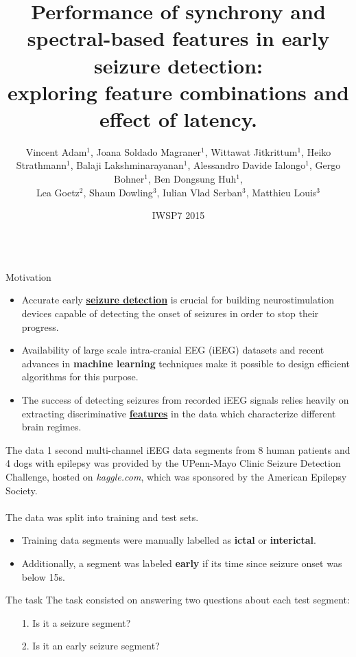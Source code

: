 \documentclass[final,t,overlay, xcolor=table, sans, mathserif]{beamer}
\title{Performance of synchrony and spectral-based features in early seizure detection:\\
exploring feature combinations and effect of latency.}
\author[Adam \& Soldado-Magraner]
{Vincent Adam$^1$, Joana Soldado Magraner$^1$, Wittawat Jitkrittum$^1$, Heiko Strathmann$^1$,
Balaji Lakshminarayanan$^1$, Alessandro Davide Ialongo$^1$, Gergo Bohner$^1$, Ben Dongsung Huh$^1$,\\
 Lea Goetz$^2$, Shaun Dowling$^3$, Iulian Vlad Serban$^3$, Matthieu Louis$^3$}
\institute[UCL]{The Gatsby Computational Neuroscience Unit$^1$, Wolfson Institute for Biomedical Research$^2$,
The Centre for Computational Statistics and Machine Learning$^3$ (CSML), UCL, London, UK.}
\date[IWSP7 2015]{IWSP7 2015}
\begin{document}
\begin{frame}{}


\begin{columns}[t]
\begin{column}{.33\linewidth}



\begin{block}{Motivation}
\begin{itemize}
\item Accurate early \underline{\bf seizure detection} is crucial for building neurostimulation devices capable of
detecting the onset of seizures in order to stop their progress.
\item Availability of large scale intra-cranial EEG (iEEG) datasets and recent advances in {\bf machine learning}
 techniques make it possible to design efficient algorithms for this purpose.
\item The success of detecting seizures from recorded iEEG signals relies heavily on
 extracting discriminative \underline{\bf features} in the data which characterize different brain regimes.
\end{itemize}
\end{block}


\begin{block}{The data}
1 second multi-channel iEEG data segments from 8 human patients and 4 dogs with epilepsy was provided by the UPenn-Mayo Clinic
Seizure Detection Challenge, hosted on \emph{kaggle.com}, which was sponsored by the American Epilepsy Society. \\
\quad \\
The data was split into training and test sets.
\begin{itemize}
\item Training data segments were manually labelled as {\bf ictal} or {\bf interictal}.
\item Additionally, a segment was labeled {\bf early} if its time since seizure onset was below 15s.
\end{itemize}
\vspace{1cm}
\end{block}


\begin{block}{The task}
\centering
The task consisted on answering two questions about each test segment:
\begin{itemize}
\centering
\item[1.] Is it a seizure segment?
\item [2.] Is it an early seizure segment?
\end{itemize}
\end{block}




\end{column}
\end{columns}
\end{frame}
\end{document}
